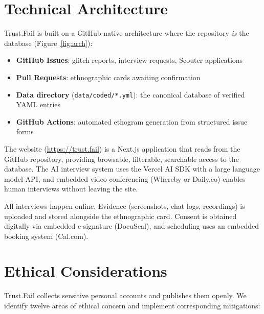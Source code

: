 \documentclass[11pt,a4paper]{article}
\begin{document}
\section{Technical Architecture}

Trust.Fail is built on a GitHub-native architecture where the repository \textit{is} the database (Figure~\ref{fig:arch}):

\begin{itemize}[noitemsep]
    \item \textbf{GitHub Issues}: glitch reports, interview requests, Scouter applications
    \item \textbf{Pull Requests}: ethnographic cards awaiting confirmation
    \item \textbf{Data directory} (\texttt{data/coded/*.yml}): the canonical database of verified YAML entries
    \item \textbf{GitHub Actions}: automated ethogram generation from structured issue forms
\end{itemize}

The website (\url{https://trust.fail}) is a Next.js application that reads from the GitHub repository, providing browsable, filterable, searchable access to the database. The AI interview system uses the Vercel AI SDK with a large language model API, and embedded video conferencing (Whereby or Daily.co) enables human interviews without leaving the site.

All interviews happen online. Evidence (screenshots, chat logs, recordings) is uploaded and stored alongside the ethnographic card. Consent is obtained digitally via embedded e-signature (DocuSeal), and scheduling uses an embedded booking system (Cal.com).

\section{Ethical Considerations}

Trust.Fail collects sensitive personal accounts and publishes them openly. We identify twelve areas of ethical concern and implement corresponding mitigations:
\end{document}
